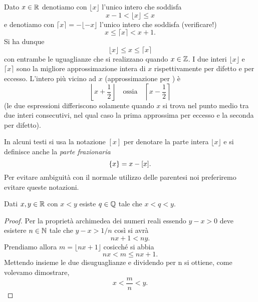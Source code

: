 \begin{definition}
\mymark{**}
Dato $x\in \mathbb R$ denotiamo con $\lfloor x\rfloor$ l'unico intero
che soddisfa
\mynote{$\lfloor\cdot\rfloor$} %
\[
  x - 1 < \lfloor x \rfloor \le x
\]
e denotiamo con $\lceil x \rceil = - \lfloor -x \rfloor$ l'unico intero che soddisfa (verificare!)
\mynote{$\lceil\cdot\rceil$} %
\[
  x \le \lceil x \rceil < x + 1.
\]
Si ha dunque
\[
  \lfloor x \rfloor \le x \le \lceil x \rceil
\]
con entrambe le uguaglianze che si realizzano quando $x\in \mathbb Z$.
I due interi $\lfloor x \rfloor$ e $\lceil x \rceil$
sono la migliore approssimazione intera di $x$ rispettivamente
per difetto e per eccesso.
L'intero più vicino ad $x$ (approssimazione per )
è
\[
  \left\lfloor x + \frac 1 2 \right\rfloor
\quad \text{ossia} \quad
  \left\lceil x-\frac 1 2 \right\rceil
\]
(le due espressioni differiscono solamente quando $x$ si trova nel punto medio tra due interi consecutivi, nel qual caso la prima approssima per eccesso e la seconda per difetto).
\end{definition}
In alcuni testi si usa la notazione $[x]$ per denotare la parte intera $\lfloor x \rfloor$ e si definisce
anche la \emph{parte frazionaria}
\[
   {\left\{ x \right\}} = x - [x].
\]
Per evitare ambiguità con il normale utilizzo delle parentesi
noi preferiremo evitare queste notazioni.

\begin{theorem}[densità di $\QQ$ in $\RR$]
\mymark{*}
Dati $x,y \in \mathbb R$ con $x<y$ esiste $q\in \mathbb Q$ tale che $x<q<y$.
\end{theorem}
%
\begin{proof}
Per la proprietà archimedea dei numeri reali essendo $y-x>0$
deve esistere $n\in \mathbb N$ tale che $y-x > 1/n$ così si avrà
\[
    nx + 1 < ny.
\]
Prendiamo allora $m=\lfloor nx + 1\rfloor$ cosicché si abbia
\[
  nx < m \le nx + 1.
\]
Mettendo insieme le due disuguaglianze e dividendo per n si ottiene,
come volevamo dimostrare,
\[
 x < \frac{m}{n} < y.
\]
\end{proof}

